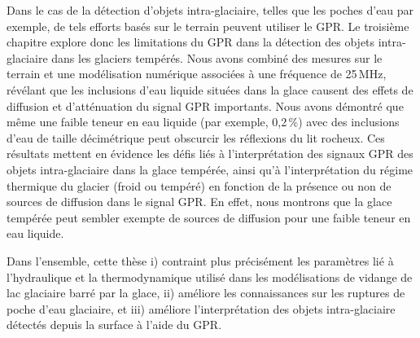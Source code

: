 Dans le cas de la détection d'objets intra-glaciaire, telles que les poches d'eau par exemple, de tels efforts basés sur le terrain peuvent utiliser le GPR. Le troisième chapitre explore donc les limitations du GPR dans la détection des objets intra-glaciaire dans les glaciers tempérés. Nous avons combiné des mesures sur le terrain et une modélisation numérique associées à une fréquence de 25\,MHz, révélant que les inclusions d'eau liquide situées dans la glace causent des effets de diffusion et d'atténuation du signal GPR importants. Nous avons démontré que même une faible teneur en eau liquide (par exemple, 0,2\,\%) avec des inclusions d'eau de taille décimétrique peut obscurcir les réflexions du lit rocheux. Ces résultats mettent en évidence les défis liés à l'interprétation des signaux GPR des objets intra-glaciaire dans la glace tempérée, ainsi qu'à l'interprétation du régime thermique du glacier (froid ou tempéré) en fonction de la présence ou non de sources de diffusion dans le signal GPR. En effet, nous montrons que la glace tempérée peut sembler exempte de sources de diffusion pour une faible teneur en eau liquide.

Dans l'ensemble, cette thèse i) contraint plus précisément les paramètres lié à l'hydraulique et la thermodynamique utilisé dans les modélisations de vidange de lac glaciaire barré par la glace, ii) améliore les connaissances sur les ruptures de poche d'eau glaciaire, et iii) améliore l'interprétation des objets intra-glaciaire détectés depuis la surface à l'aide du GPR.



\endgroup

\vfill